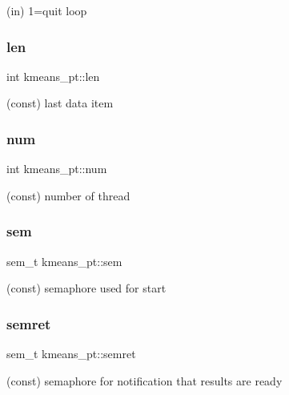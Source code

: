 (in) 1=quit loop 

\mbox{\label{structkmeans__pt_af49609aa1989feab464cfc85a25c3ec4}} 
\subsubsection{\texorpdfstring{len}{len}}
{\footnotesize\ttfamily int kmeans\+\_\+pt\+::len}



(const) last data item 

\mbox{\label{structkmeans__pt_a72c17b986e5cc7bbdcc92d59ef05e8f0}} 
\subsubsection{\texorpdfstring{num}{num}}
{\footnotesize\ttfamily int kmeans\+\_\+pt\+::num}



(const) number of thread 

\mbox{\label{structkmeans__pt_af1c42a889c6180d899cb41066d2884c0}} 
\subsubsection{\texorpdfstring{sem}{sem}}
{\footnotesize\ttfamily sem\+\_\+t kmeans\+\_\+pt\+::sem}



(const) semaphore used for start 

\mbox{\label{structkmeans__pt_aa959612fc7e6fa42798130bbf1c437a7}} 
\subsubsection{\texorpdfstring{semret}{semret}}
{\footnotesize\ttfamily sem\+\_\+t kmeans\+\_\+pt\+::semret}



(const) semaphore for notification that results are ready 

